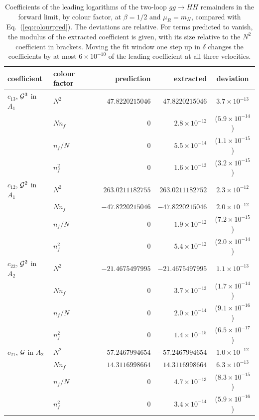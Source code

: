 \begin{table}[!htb]
\centering
\small
\begin{tabular}{llrrc}
\toprule
coefficient & colour factor & prediction & extracted & deviation\\
\midrule
$c_{13}$, $\mathcal G^3$ in $A_1$ & $N^2$ & $47.8220215046$ & $47.8220215046$ & $3.7\times10^{-13}$\\
 & $Nn_f$ & $0$ & $2.8\times10^{-12}$ & ($5.9\times10^{-14}$)\\
 & $n_f/N$ & $0$ & $5.5\times10^{-14}$ & ($1.1\times10^{-15}$)\\
 & $n_f^2$ & $0$ & $1.6\times10^{-13}$ & ($3.2\times10^{-15}$)\\
\midrule
$c_{12}$, $\mathcal G^2$ in $A_1$ & $N^2$ & $263.0211182755$ & $263.0211182752$ & $2.3\times10^{-12}$\\
 & $Nn_f$ & $-47.8220215046$ & $-47.8220215046$ & $2.0\times10^{-12}$\\
 & $n_f/N$ & $0$ & $1.9\times10^{-12}$ & ($7.2\times10^{-15}$)\\
 & $n_f^2$ & $0$ & $5.4\times10^{-12}$ & ($2.0\times10^{-14}$)\\
\midrule
$c_{22}$, $\mathcal G^2$ in $A_2$ & $N^2$ & $-21.4675497995$ & $-21.4675497995$ & $1.1\times10^{-13}$\\
 & $Nn_f$ & $0$ & $3.7\times10^{-13}$ & ($1.7\times10^{-14}$)\\
 & $n_f/N$ & $0$ & $2.0\times10^{-14}$ & ($9.1\times10^{-16}$)\\
 & $n_f^2$ & $0$ & $1.4\times10^{-15}$ & ($6.5\times10^{-17}$)\\
\midrule
$c_{21}$, $\mathcal G$ in $A_2$ & $N^2$ & $-57.2467994654$ & $-57.2467994654$ & $1.0\times10^{-12}$\\
 & $Nn_f$ & $14.3116998664$ & $14.3116998664$ & $6.3\times10^{-13}$\\
 & $n_f/N$ & $0$ & $4.7\times10^{-13}$ & ($8.3\times10^{-15}$)\\
 & $n_f^2$ & $0$ & $3.4\times10^{-14}$ & ($5.9\times10^{-16}$)\\
\bottomrule
\end{tabular}
\caption{Coefficients of the leading logarithms of the two-loop $gg\to HH$ remainders in the forward limit, by colour factor, at $\beta=1/2$ and $\mu_R=m_H$, compared with Eq.~(\ref{eq:colourpred}). The deviations are relative. For terms predicted to vanish, the modulus of the extracted coefficient is given, with its size relative to the $N^2$ coefficient in brackets. Moving the fit window one step up in $\delta$ changes the coefficients by at most $6\times10^{-10}$ of the leading coefficient at all three velocities.}
\label{tab:colour}
\end{table}
